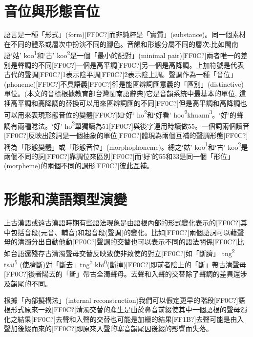\section{\rmfamily 音位與形態音位}

\textrm{語言是一種「形式」(form)}[FF0C?]\textrm{而非純粹是「實質」(substance)}。\textrm{同一個素材在不同的體系或層次中扮演不同的腳色。音韻和形態分屬不同的層次:比如閩南語‘姑’ koo}\textrm{\textsuperscript{1}}\textrm{和‘古’ koo}\textrm{\textsuperscript{2}}\textrm{是一個「最小的配對」(minimal pair)}[FF0C?]\textrm{兩者唯一的差別是聲調的不同[FF0C?]一個是高平調[FF0C?]另一個是高降調。上加符號是代表古代的聲調[FF0C?]1表示陰平調[FF0C?]2表示陰上調。聲調作為一種「音位」(phoneme)}[FF0C?]\textrm{不具語義[FF0C?]卻是能區辨詞匯意義的「區別」(distinctive)單位。(本文的音標根據教育部台灣閩南語辭典)它是音韻系統中最基本的單位, 這裡高平調和高降調的替換可以用來區辨詞匯的不同[FF0C?]但是高平調和高降調也可以用來表現形態音位的變體[FF0C?]如‘好’ ho}\textrm{\textsuperscript{2}}\textrm{和‘好看’ hoo}\textrm{\textsuperscript{2}}\textrm{khuann}\textrm{\textsuperscript{3}}。\textrm{‘好’的聲調有兩種唸法。‘好’ ho}\textrm{\textsuperscript{2}}\textrm{單獨讀為51}[FF0C?]\textrm{與後字連用時讀做55}。\textrm{一個詞兩個讀音[FF0C?]反映出該詞是一個抽象的單位[FF0C?]體現為兩個互補的聲調形態[FF0C?]稱為「形態變體」或「形態音位」(morphophoneme)}。\textrm{總之‘姑’ koo}\textrm{\textsuperscript{1}}\textrm{和‘古’ koo}\textrm{\textsuperscript{2}}\textrm{是兩個不同的詞[FF0C?]靠調位來區別[FF0C?]而‘好’的55和33是同一個「形位」(morpheme)的兩個不同的調形[FF0C?]彼此互補。}

\section{\rmfamily 形態和漢語類型演變}

\textrm{上古漢語或遠古漢語時期有些語法現象是由語根內部的形式變化表示的[FF0C?]其中包括音段(元音、輔音)和超音段(聲調)的變化。比如[FF0C?]兩個語詞可以藉聲母的清濁分出自動他動[FF0C?]聲調的交替也可以表示不同的語法關係[FF0C?]比如台語還殘存古清濁聲母交替反映致使非致使的對立[FF0C?]如「斷臍」 tng}\textrm{\textsuperscript{2}} \textrm{tsai}\textrm{\textsuperscript{5}} \textrm{(使臍斷)對「斷去」tng}\textrm{\textsuperscript{7}} \textrm{khi}\textrm{\textsuperscript{0}}\textrm{(斷掉)}[FF0C?]\textrm{即前者陰上的「斷」帶古清聲母[FF0C?]後者陽去的「斷」帶古全濁聲母。去聲和入聲的交替除了聲調的差異還涉及韻尾的不同。}

\begin{stylei}
根據「內部擬構法」(internal reconstruction)我們可以假定更早的階段[FF0C?]語根形式原來一致[FF0C?]清濁交替的產生是由於鼻音前綴使其中一個語根的聲母濁化之結果[FF0C?]去聲和入聲的交替也可能是加綴的結果[FF1B?]去聲可能是由入聲加後綴而來的[FF0C?]即原來入聲的塞音韻尾因後綴的影響而失落。
\end{stylei}

